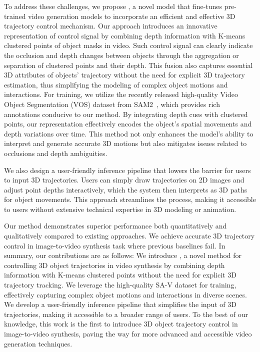 To address these challenges, we propose \method, a novel model that fine-tunes pre-trained video generation models to incorporate an efficient and effective 3D trajectory control mechanism. 
Our approach introduces an innovative representation of control signal by combining depth information with K-means clustered points of object masks in video. Such control signal can clearly indicate the occlusion and depth changes between objects through the aggregation or separation of clustered points and their depth.
This fusion also captures essential 3D attributes of objects' trajectory without the need for explicit 3D trajectory estimation, thus simplifying the modeling of complex object motions and interactions. For training, we utilize the recently released high-quality Video Object Segmentation (VOS) dataset from SAM2~\cite{SAM2}, which provides rich annotations conducive to our method. By integrating depth cues with clustered points, our representation effectively encodes the object's spatial movements and depth variations over time. This method not only enhances the model's ability to interpret and generate accurate 3D motions but also mitigates issues related to occlusions and depth ambiguities.

We also design a user-friendly inference pipeline that lowers the barrier for users to input 3D trajectories. Users can simply draw trajectories on 2D images and adjust point depths interactively, which the system then interprets as 3D paths for object movements. This approach streamlines the process, making it accessible to users without extensive technical expertise in 3D modeling or animation. 

Our method demonstrates superior performance both quantitatively and qualitatively compared to existing approaches. We achieve accurate 3D trajectory control in image-to-video synthesis task where previous baselines fail.
In summary, our contributions are as follows: We introduce \method, a novel method for controlling 3D object trajectories in video synthesis by combining depth information with K-means clustered points without the need for explicit 3D trajectory tracking. We leverage the high-quality SA-V dataset for training, effectively capturing complex object motions and interactions in diverse scenes. We develop a user-friendly inference pipeline that simplifies the input of 3D trajectories, making it accessible to a broader range of users. To the best of our knowledge, this work is the first to introduce 3D object trajectory control in image-to-video synthesis, paving the way for more advanced and accessible video generation techniques.